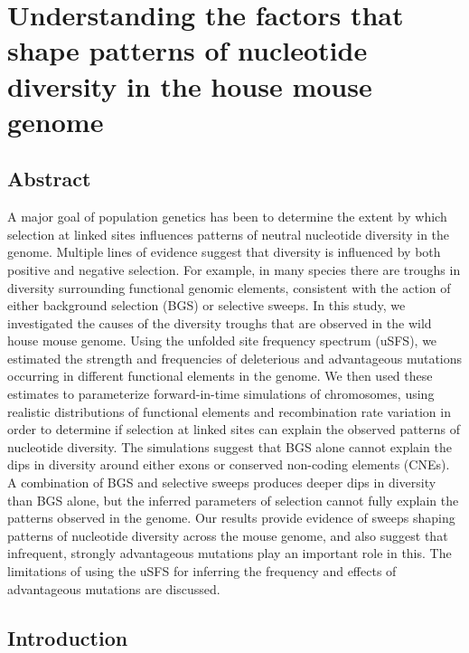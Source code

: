 \chapter{Understanding the factors that shape patterns of nucleotide diversity in the house mouse genome}



\section{Abstract}
	A major goal of population genetics has been to determine the extent by which selection at linked sites influences patterns of neutral nucleotide diversity in the genome. Multiple lines of evidence suggest that diversity is influenced by both positive and negative selection. For example, in many species there are troughs in diversity surrounding functional genomic elements, consistent with the action of either background selection (BGS) or selective sweeps. In this study, we investigated the causes of the diversity troughs that are observed in the wild house mouse genome. Using the unfolded site frequency spectrum (uSFS), we estimated the strength and frequencies of deleterious and advantageous mutations occurring in different functional elements in the genome. We then used these estimates to parameterize forward-in-time simulations of chromosomes, using realistic distributions of functional elements and recombination rate variation in order to determine if selection at linked sites can explain the observed patterns of nucleotide diversity. The simulations suggest that BGS alone cannot explain the dips in diversity around either exons or conserved non-coding elements (CNEs). A combination of BGS and selective sweeps produces deeper dips in diversity than BGS alone, but the inferred parameters of selection cannot fully explain the patterns observed in the genome. Our results provide evidence of sweeps shaping patterns of nucleotide diversity across the mouse genome, and also suggest that infrequent, strongly advantageous mutations play an important role in this. The limitations of using the uSFS for inferring the frequency and effects of advantageous mutations are discussed.

\section{Introduction}
 
